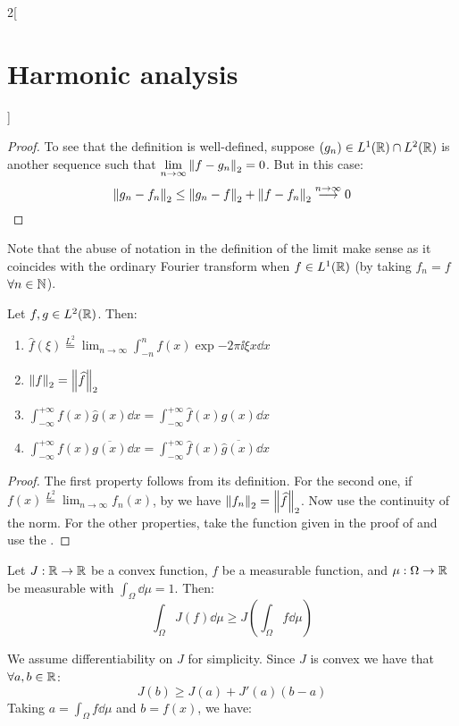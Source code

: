 \documentclass[../../../main_math.tex]{subfiles}
\begin{document}
\begin{multicols}{2}[\section{Harmonic analysis}]
\begin{proof}
    To see that the definition is well-defined, suppose $(g_n)\in L^1(\mathbb{R})\cap L^2(\mathbb{R})$ is another sequence such that $\displaystyle\lim_{n\to\infty}\left\|f-g_n\right\|_2=0$. But in this case:
    $$\left\|g_n-f_n\right\|_2\leq\left\|g_n-f\right\|_2+\left\|f-f_n\right\|_2\overset{n\to\infty}{\longrightarrow}0$$
  \end{proof}
  \begin{remark}
    Note that the abuse of notation in the definition of the limit make sense as it coincides with the ordinary Fourier transform when $f\in L^1(\mathbb{R})$ (by taking $f_n=f$ $\forall n\in\mathbb{N}$).
  \end{remark}
  \begin{theorem}
    Let $f,g\in L^2(\mathbb{R})$. Then:
    \begin{enumerate}
      \item $\displaystyle\widehat{f}(\xi)\overset{L^2}{=}\lim_{n\to\infty}\int_{-n}^nf(x)\exp{-2\pi\ii \xi x}\dd{x}$
      \item $\left\|f\right\|_2=\left\|\widehat{f}\right\|_2$
      \item $\displaystyle\int_{-\infty}^{+\infty}f(x)\widehat{g}(x)\dd{x}=\int_{-\infty}^{+\infty}\widehat{f}(x)g(x)\dd{x}$
      \item $\displaystyle\int_{-\infty}^{+\infty}f(x)\overline{g(x)}
              \dd{x}=\int_{-\infty}^{+\infty}\widehat{f}(x)\overline{\widehat{g}(x)}\dd{x}$
    \end{enumerate}
  \end{theorem}
  \begin{proof}
    The first property follows from its definition. For the second one, if $\displaystyle f(x)\overset{L^2}{=}\lim_{n\to\infty}f_n(x)$, by  we have $\left\|f_n\right\|_2=\left\|\widehat{f}\right\|_2$. Now use the continuity of the norm. For the other properties, take the function given in the proof of  and use the .
  \end{proof}
  \begin{proposition}
    Let $J:\mathbb{R}\to\mathbb{R}$ be a convex function, $f$ be a measurable function, and $\mu:\Omega\to\mathbb{R}$ be measurable with $\int_\Omega\dd{\mu}=1$. Then:
    $$
      \int_\Omega J(f)\dd{\mu}\geq J\left(\int_\Omega f\dd{\mu}\right)
    $$
  \end{proposition}
  \begin{sproof}
    We assume differentiability on $J$ for simplicity. Since $J$ is convex we have that $\forall a,b\in\mathbb{R}$:
    $$J(b)\geq J(a)+J'(a)(b-a)$$
    Taking $a=\int_\Omega f\dd{\mu}$ and $b=f(x)$, we have:

\end{sproof}
\end{multicols}
\end{document}
